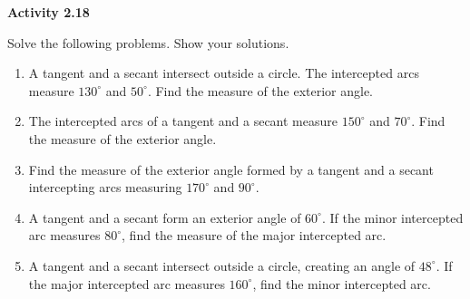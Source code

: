 \vspace{0.3ex}
\noindent\textbf{Activity 2.18}

\vspace{0.2ex}

Solve the following problems. Show your solutions.

\begin{enumerate}
    \item A tangent and a secant intersect outside a circle. The intercepted arcs measure $130^\circ$ and $50^\circ$. Find the measure of the exterior angle.
    \item The intercepted arcs of a tangent and a secant measure $150^\circ$ and $70^\circ$. Find the measure of the exterior angle.
    \item Find the measure of the exterior angle formed by a tangent and a secant intercepting arcs measuring $170^\circ$ and $90^\circ$.
    \item A tangent and a secant form an exterior angle of $60^\circ$. If the minor intercepted arc measures $80^\circ$, find the measure of the major intercepted arc.
    \item A tangent and a secant intersect outside a circle, creating an angle of $48^\circ$. If the major intercepted arc measures $160^\circ$, find the minor intercepted arc.
\end{enumerate}
